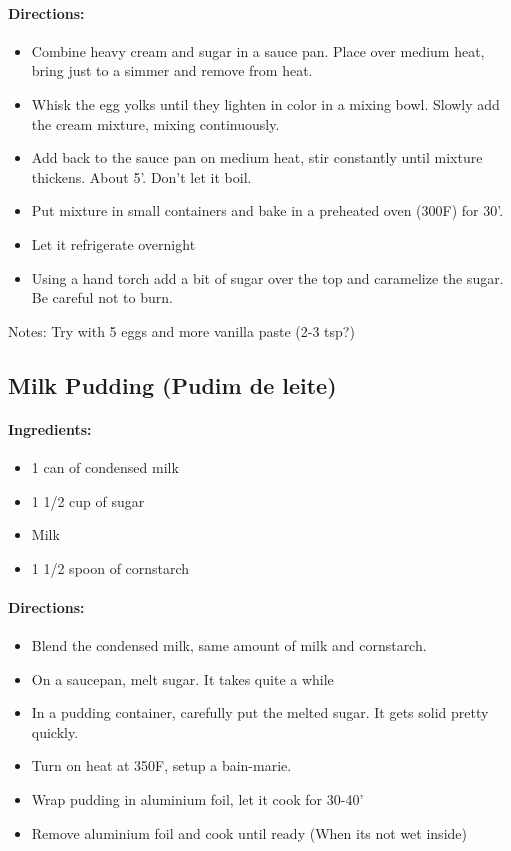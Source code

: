 \documentclass{article}
\begin{document}
\paragraph{Directions:}
\begin{itemize}
\item Combine heavy cream and sugar in a sauce pan. Place over medium heat, bring just to a simmer and remove from heat.

\item Whisk the egg yolks until they lighten in color in a mixing bowl. Slowly add the cream mixture, mixing continuously.
\item Add back to the sauce pan on medium heat, stir constantly until mixture thickens. About 5'. Don't let it boil.
\item Put mixture in small containers and bake in a preheated oven (300F) for 30'. 
\item Let it refrigerate overnight
\item Using a hand torch add a bit of sugar over the top and caramelize the sugar. Be careful not to burn.
\end{itemize}

Notes: Try with 5 eggs and more vanilla paste (2-3 tsp?)

\subsection{Milk Pudding (Pudim de leite)}

\paragraph{Ingredients:}

\begin{itemize}
	\item 1 can of condensed milk
	\item 1 1/2 cup of sugar
	\item Milk
	\item 1 1/2 spoon of cornstarch
\end{itemize}

\paragraph{Directions:}
\begin{itemize}
	\item Blend the condensed milk, same amount of milk and cornstarch.
	\item On a saucepan, melt sugar. It takes quite a while
	\item In a pudding container, carefully put the melted sugar. It gets solid pretty quickly.
	\item Turn on heat at 350F, setup a bain-marie.
	\item Wrap pudding in aluminium foil, let it cook for 30-40'
	\item Remove aluminium foil and cook until ready (When its not wet inside)
\end{itemize}
\end{document}
